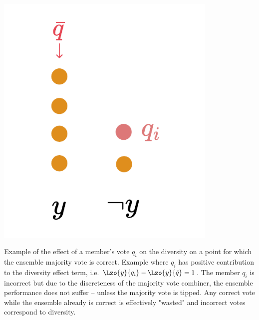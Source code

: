\documentclass[../main.tex]{subfiles}
\begin{document}
\begin{marginfigure}
    \label{fig:zeroone-div-eff-good}
    \includegraphics[width=0.8\textwidth]{figma-illustrations/zeroone-div-effect-good.pdf}
    \caption{
        Example of the effect of a member's vote $q_i$ on the diversity on a point for which the ensemble majority vote is correct.
    Example where $q_i$ has positive contribution to the diversity effect term, i.e. 
$\Lzo{y}{q_{i}} - \Lzo{y}{\bar{q}} = 1$. The member $q_{i}$ is incorrect but due to the discreteness of the majority vote combiner, the ensemble performance does not suffer -- unless the majority vote is tipped. Any correct vote while the ensemble already is correct is effectively "wasted" and incorrect votes correspond to diversity.
}
\end{marginfigure}
\end{document}
